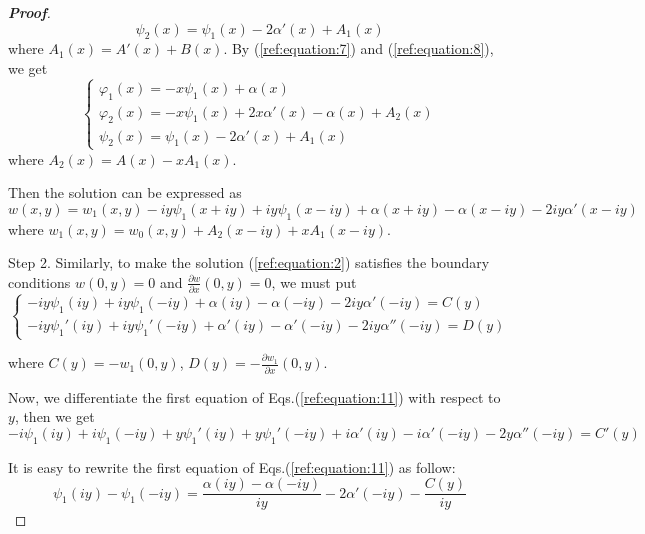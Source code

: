 \documentclass[a4paper]{article}      %
\begin{document}
\begin{proof}[{\bf Proof}]
\begin{equation}
        \psi_{2}(x)=\psi_{1}(x)-2\alpha'(x)+A_{1}(x)
        \end{equation}
    where $A_{1}(x)=A'(x)+B(x)$. By (\ref{ref:equation:7}) and (\ref{ref:equation:8}), we get
        \begin{equation}\label{ref:equation:9}                                  %
        \left\{ {\begin{array}{*{20}{l}}
         {\varphi_{1}(x)=-x\psi_{1}(x)+\alpha(x)}\\
         {\varphi_{2}(x)=-x\psi_{1}(x)+2x\alpha'(x)-\alpha(x)+A_{2}(x)}\\
         {\psi_{2}(x)=\psi_{1}(x)-2\alpha'(x)+A_{1}(x)}
        \end{array}} \right.
        \end{equation}
    where $A_{2}(x)=A(x)-xA_{1}(x)$.%

    Then the solution can be expressed as
    \begin{equation}\label{ref:equation:10}
    w(x,y)={w_1}(x,y) - iy\psi_{1}(x + iy) + iy\psi_{1}(x - iy) + \alpha (x + iy) - \alpha (x - iy) - 2iy\alpha '(x - iy)
    \end{equation}
    where ${w_1}(x,y) = {w_0}(x,y) + {A_2}(x - iy) + x{A_1}(x - iy)$.
\item[\quad Step 2.]Similarly, to make the solution (\ref{ref:equation:2}) satisfies the boundary conditions $w(0,y)=0$ and $\frac{{\partial w}}{{\partial x}}(0,y)=0$, we must put
    \begin{equation}\label{ref:equation:11}
    \left\{ {\begin{array}{*{20}{l}}
    {-iy\psi_{1}(iy)+iy\psi_{1}(-iy)+\alpha(iy)-\alpha(-iy)-2iy\alpha'(-iy)=C(y)}\\
    {-iy\psi_{1}'(iy)+iy\psi_{1}'(-iy)+\alpha'(iy)-\alpha'(-iy)-2iy\alpha''(-iy)=D(y)}
    \end{array}}\right.
    \end{equation}

where $C(y)=-w_1(0,y)$, $D(y)=-\frac{\displaystyle \partial w_1}{\displaystyle \partial x}(0,y)$.

Now, we differentiate the first equation of Eqs.(\ref{ref:equation:11}) with respect to $y$, then we get
    \begin{equation}\label{ref:equation:12}
    -i\psi_1(iy)+i\psi_{1}(-iy)+y\psi_{1}'(iy)+y\psi_{1}'(-iy)+i\alpha'(iy)-i\alpha'(-iy)-2y\alpha''(-iy)=C'(y)
    \end{equation}

It is easy to rewrite the first equation of Eqs.(\ref{ref:equation:11}) as follow:
\begin{equation}\label{ref:equation:13}
\psi_{1}(iy)-\psi_{1}(-iy)=\frac{\alpha(iy)-\alpha(-iy)}{iy}-2\alpha'(-iy)-\frac{C(y)}{iy}
\end{equation}


\end{proof}
\end{document}
